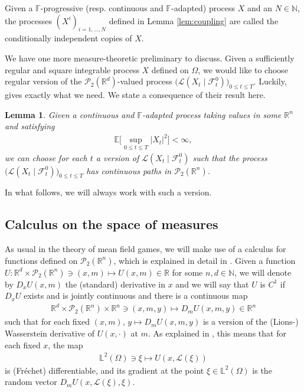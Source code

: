 \documentclass[11pt,reqno]{amsart}
\numberwithin{equation}{section}
\newtheorem{lemma}[theorem]{Lemma}
\theoremstyle{definition}
\def\E{{\mathbb E}}
\def\R{{\mathbb R}}
\def\N{{\mathbb N}}
\def\L{{\mathcal L}}
\newcommand{\sP}{\mathcal{P}}
\newcommand{\sL}{\mathcal{L}}
\newcommand{\spt}{\mathcal{P}_2(\R^n)}
\newcommand{\sF}{\mathcal{F}}
\newcommand{\bbF}{\mathbb{F}}
\def \E{\mathbb{E}}
\def \L{\mathbb{L}}
\def \N{\mathbb{N}}
\def \R{\mathbb{R}}
\begin{document}
\begin{definition} \label{def:condindcopies}
Given a $\bbF$-progressive (resp. continuous and $\bbF$-adapted) process $X$ and an $N \in \N$, the processes $(X^i)_{i = 1,\dots,N}$ defined in Lemma \ref{lem:coupling} are called the conditionally independent copies of $X$.
\end{definition}

We have one more measure-theoretic preliminary to discuss. Given a sufficiently regular and square integrable process $X$ defined on $\Omega$, we would like to choose regular version of the $\sP_2(\R^d)$-valued process $\big(\sL(X_t \mid \sF_t^0)\big)_{0 \leq t \leq T}$. Luckily, \cite[Lemma 2.5]{cardelbook2} gives exactly what we need. We state a consequence of their result here. 

\begin{lemma} \label{lem:conditionallaw}
Given a continuous and $\bbF$-adapted process taking values in some $\R^n$ and satisfying 
\begin{align*}
\E\Big [\sup_{0 \leq t \leq T} |X_t|^2 \Big] < \infty, 
\end{align*}
we can choose for each $t$ a version of $\sL(X_t \mid \sF_t^0)$ such that the process $\big(\sL(X_t \mid \sF_t^0)\big)_{0 \leq t \leq T}$ has continuous paths in $\spt$. 
\end{lemma}
In what follows, we will always work with such a version.

\subsection{Calculus on the space of measures}

As usual in the theory of mean field games, we will make use of a calculus for functions defined on $\spt$, which is explained in detail in \cite[Chapter 5]{cardelbook1}. Given a function $U :  \R^d \times \spt \ni (x,m) \mapsto  U(x,m)\in \R $ for some $n,d\in \N$, we will denote by $D_x U(x,m)$ the (standard) derivative in $x$ and we will say that $U$ is $C^1$ if $D_xU$ exists and is jointly continuous and there is a continuous map 
\begin{align*}
  \R^d \times \spt \times \R^n \ni (x,m,y) \mapsto D_m U(x,m,y) \in \R^n
\end{align*}
such that for each fixed $(x,m)$, $y \mapsto D_m U(x,m,y)$ is a version of the (Lions-) Wasserstein derivative of $U(x,\cdot)$ at $m$. 
As explained in \cite{cardelbook1}, this means that for each fixed $x$, the map 
\begin{align*}
  \L^2(\Omega) \ni \xi \mapsto  U(x,\sL(\xi))
\end{align*}
is (Fr\'echet) differentiable, and its gradient at the point $\xi \in \L^2(\Omega)$ is the random vector $ D_m U(x, \sL(\xi), \xi)$. 
\end{document}
